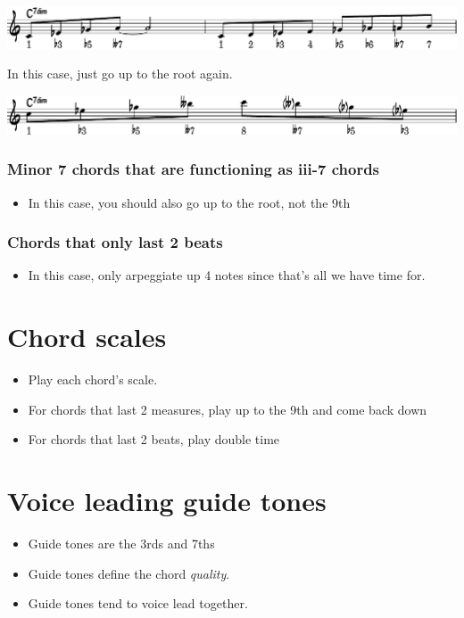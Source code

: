 \documentclass[11pt]{article}
\begin{document}
\begin{center}
\includegraphics[width=0.98\linewidth]{diminished-scale-and-arpeg.pdf}
\end{center}

In this case, just go up to the root again.

\begin{center}
\includegraphics[width=0.98\linewidth]{arpeg-9th-dim.pdf}
\end{center}

\subsubsection{Minor 7 chords that are functioning as iii-7 chords}
\label{sec:org25633ff}
\begin{itemize}
\item In this case, you should also go up to the root, not the 9th
\end{itemize}
\subsubsection{Chords that only last 2 beats}
\label{sec:org2322a82}
\begin{itemize}
\item In this case, only arpeggiate up 4 notes since that's all we have time for.
\end{itemize}
\section{Chord scales}
\label{sec:orga72f41d}
\begin{itemize}
\item Play each chord's scale.
\item For chords that last 2 measures, play up to the 9th and come back down
\item For chords that last 2 beats, play double time
\end{itemize}
\section{Voice leading guide tones}
\label{sec:orga16c20e}
\begin{itemize}
\item Guide tones are the 3rds and 7ths
\item Guide tones define the chord \emph{quality}.
\item Guide tones tend to voice lead together.
\end{itemize}
\end{document}

